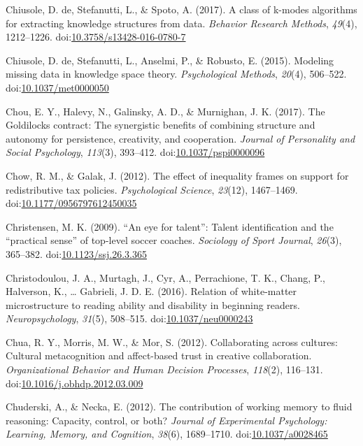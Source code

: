 \documentclass[english,man]{apa6}
\begin{document}
\hypertarget{ref-DeChiusole2016}{}
Chiusole, D. de, Stefanutti, L., \& Spoto, A. (2017). A class of k-modes
algorithms for extracting knowledge structures from data. \emph{Behavior
Research Methods}, \emph{49}(4), 1212--1226.
doi:\href{https://doi.org/10.3758/s13428-016-0780-7}{10.3758/s13428-016-0780-7}

\hypertarget{ref-Chiusole2015}{}
Chiusole, D. de, Stefanutti, L., Anselmi, P., \& Robusto, E. (2015).
Modeling missing data in knowledge space theory. \emph{Psychological
Methods}, \emph{20}(4), 506--522.
doi:\href{https://doi.org/10.1037/met0000050}{10.1037/met0000050}

\hypertarget{ref-Chou2017}{}
Chou, E. Y., Halevy, N., Galinsky, A. D., \& Murnighan, J. K. (2017).
The Goldilocks contract: The synergistic benefits of combining structure
and autonomy for persistence, creativity, and cooperation. \emph{Journal
of Personality and Social Psychology}, \emph{113}(3), 393--412.
doi:\href{https://doi.org/10.1037/pspi0000096}{10.1037/pspi0000096}

\hypertarget{ref-Chow2012}{}
Chow, R. M., \& Galak, J. (2012). The effect of inequality frames on
support for redistributive tax policies. \emph{Psychological Science},
\emph{23}(12), 1467--1469.
doi:\href{https://doi.org/10.1177/0956797612450035}{10.1177/0956797612450035}

\hypertarget{ref-Christensen2009}{}
Christensen, M. K. (2009). ``An eye for talent'': Talent identification
and the ``practical sense'' of top-level soccer coaches. \emph{Sociology
of Sport Journal}, \emph{26}(3), 365--382.
doi:\href{https://doi.org/10.1123/ssj.26.3.365}{10.1123/ssj.26.3.365}

\hypertarget{ref-Christodoulou2016}{}
Christodoulou, J. A., Murtagh, J., Cyr, A., Perrachione, T. K., Chang,
P., Halverson, K., \ldots{} Gabrieli, J. D. E. (2016). Relation of
white-matter microstructure to reading ability and disability in
beginning readers. \emph{Neuropsychology}, \emph{31}(5), 508--515.
doi:\href{https://doi.org/10.1037/neu0000243}{10.1037/neu0000243}

\hypertarget{ref-Chua2012}{}
Chua, R. Y., Morris, M. W., \& Mor, S. (2012). Collaborating across
cultures: Cultural metacognition and affect-based trust in creative
collaboration. \emph{Organizational Behavior and Human Decision
Processes}, \emph{118}(2), 116--131.
doi:\href{https://doi.org/10.1016/j.obhdp.2012.03.009}{10.1016/j.obhdp.2012.03.009}

\hypertarget{ref-Chuderski2012}{}
Chuderski, A., \& Necka, E. (2012). The contribution of working memory
to fluid reasoning: Capacity, control, or both? \emph{Journal of
Experimental Psychology: Learning, Memory, and Cognition}, \emph{38}(6),
1689--1710.
doi:\href{https://doi.org/10.1037/a0028465}{10.1037/a0028465}
\end{document}
